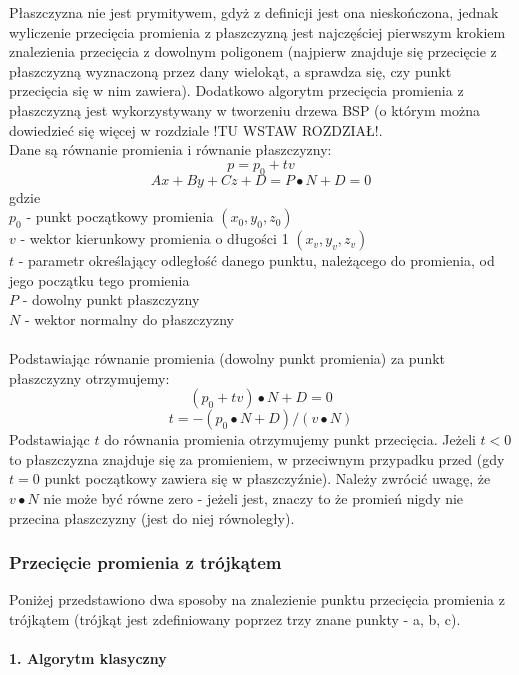 Płaszczyzna nie jest prymitywem, gdyż z definicji jest ona nieskończona, jednak wyliczenie przecięcia promienia z płaszczyzną jest najczęściej pierwszym krokiem znalezienia przecięcia z dowolnym poligonem (najpierw znajduje się przecięcie z płaszczyzną wyznaczoną przez dany wielokąt, a sprawdza się, czy punkt przecięcia się w nim zawiera). Dodatkowo algorytm przecięcia promienia z płaszczyzną jest wykorzystywany w tworzeniu drzewa BSP (o którym można dowiedzieć się więcej w rozdziale !TU WSTAW ROZDZIAŁ!. \\
\noindent
Dane są równanie promienia i równanie płaszczyzny:
$$p = p_0 + tv$$
$$Ax + By + Cz + D = P \bullet N + D = 0$$
gdzie
\\
$p_0$ - punkt początkowy promienia $(x_0, y_0, z_0)$ \\
$v$ - wektor kierunkowy promienia o długości 1 $(x_v, y_v, z_v)$ \\
$t$ - parametr określający odległość danego punktu, należącego do promienia, od jego początku tego promienia \\
$P$ - dowolny punkt płaszczyzny \\
$N$ - wektor normalny do płaszczyzny \\
\\
Podstawiając równanie promienia (dowolny punkt promienia) za punkt płaszczyzny otrzymujemy:
$$(p_0 + tv) \bullet N + D = 0$$
$$t = -(p_0 \bullet N + D)/(v \bullet N)$$
Podstawiając $t$ do równania promienia otrzymujemy punkt przecięcia. Jeżeli $t < 0$ to płaszczyzna znajduje się za promieniem, w przeciwnym przypadku przed (gdy $t = 0$ punkt początkowy zawiera się w płaszczyźnie). Należy zwrócić uwagę, że $v \bullet N$ nie może być równe zero - jeżeli jest, znaczy to że promień nigdy nie przecina płaszczyzny (jest do niej równoległy).

\subsubsection{Przecięcie promienia z trójkątem}

Poniżej przedstawiono dwa sposoby na znalezienie punktu przecięcia promienia z trójkątem (trójkąt jest zdefiniowany poprzez trzy znane punkty - a, b, c).


\paragraph{1. Algorytm klasyczny}\mbox{} \\

